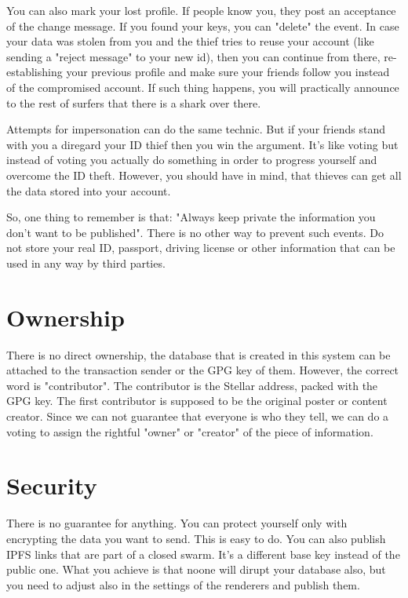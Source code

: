 \documentclass[10pt,a4paper,twocolumn]{paper}
\begin{document}
	You can also mark your lost profile. If people know you, they post an acceptance of the change message. If you found your keys, you can "delete" the event. In case your data was stolen from you and the thief tries to reuse your account (like sending a "reject message" to your new id), then you can continue from there, re-establishing your previous profile and make sure your friends follow you instead of the compromised account. If such thing happens, you will practically announce to the rest of surfers that there is a shark over there.

	Attempts for impersonation can do the same technic. But if your friends stand with you a diregard your ID thief then you win the argument. It's like voting but instead of voting you actually do something in order to progress yourself and overcome the ID theft. However, you should have in mind, that thieves can get all the data stored into your account.
	
	So, one thing to remember is that: "Always keep private the information you don't want to be published". There is no other way to prevent such events. Do not store your real ID, passport, driving license or other information that can be used in any way by third parties.
	
	\section{Ownership}\label{ownership}
	
	There is no direct ownership, the database that is created in this system can be attached to the transaction sender or the GPG key of them. However, the correct word is "contributor". The contributor is the Stellar address, packed with the GPG key. The first contributor is supposed to be the original poster or content creator. Since we can not guarantee that everyone is who they tell, we can do a voting to assign the rightful "owner" or "creator" of the piece of information.
	
	\section{Security}\label{security}
	There is no guarantee for anything. You can protect yourself only with encrypting the data you want to send. This is easy to do. You can also publish IPFS links that are part of a closed swarm. It's a different base key instead of the public one. What you achieve is that noone will dirupt your database also, but you need to adjust also in the settings of the renderers and publish them.
\end{document}
